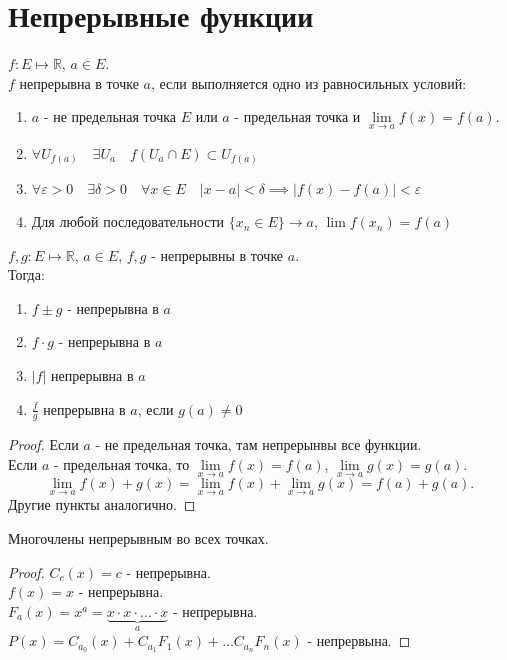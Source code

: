 \documentclass[11pt, oneside]{article}   	%
\begin{document}
\section{Непрерывные функции}
    \begin{definition}
        $f: E \mapsto \mathbb{R}$, $a\in E$.\\
        $f$ непрерывна в точке $a$, если выполняется одно из равносильных условий:
        \begin{enumerate}
            \item $a$ - не предельная точка $E$ или $a$ - предельная точка и $\lim\limits_{x \to a} f(x) = f(a)$.
            \item $\forall{U_{f(a)}}\quad \exists{U_a}\quad f(U_a\cap E) \subset U_{f(a)}$
            \item $\forall{\varepsilon>0}\quad \exists{\delta>0}\quad \forall{x\in E}\quad |x-a|<\delta \implies |f(x)-f(a)| < \varepsilon$
            \item Для любой последовательности $\{x_n\in E\} \to a $, $\lim f(x_n) = f(a) $
        \end{enumerate}
    \end{definition}
    \begin{theorem}
        $f, g : E \mapsto \mathbb{R}$, $a\in E$, $f,g$ - непрерывны в точке $a$.\\
        Тогда:
        \begin{enumerate}
            \item $f\pm g$ - непрерывна в $a$
            \item $f\cdot g$ - непрерывна в $a$
            \item $|f|$ непрерывна в $a$
            \item $ \frac{f}{g}$ непрерывна в $a$, если $g(a) \neq 0$
        \end{enumerate}
        \begin{proof}
            Если $a$ - не предельная точка, там непрерынвы все функции.\\
            Если $a$ - предельная точка, то $\lim\limits_{x \to a} f(x) = f(a)$, $\lim\limits_{x \to a} g(x) = g(a)$.
            \[ \lim\limits_{x \to a} f(x)+g(x) = \lim\limits_{x \to a} f(x) + \lim\limits_{x \to a} g(x) = f(a) + g(a) .\]
            Другие пункты аналогично.
        \end{proof}
    \end{theorem}
    \begin{tlemma}
        Многочлены непрерывным во всех точках.
        \begin{proof}
            $C_c(x) = c$ - непрерывна.\\
            $f(x) = x$ - непрерывна.\\
            $F_a(x) = x^{a} = \underbrace{x\cdot x\cdot \ldots\cdot x}_{a} $ - непрерывна.\\
            $P(x) = C_{a_0}(x) + C_{a_1}F_{1}(x) + \ldots C_{a_n}F_n(x)$ - непрервына.
        \end{proof}
    \end{tlemma}
\end{document}
